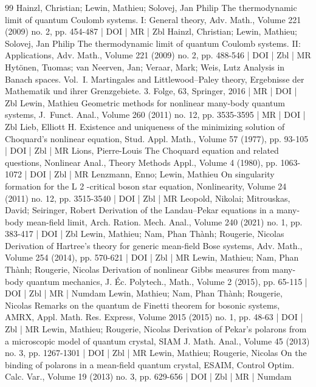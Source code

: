 \begin{thebibliography}{99}
 Hainzl, Christian; Lewin, Mathieu; Solovej, Jan Philip The thermodynamic limit of quantum Coulomb systems. I: General theory, Adv. Math., Volume 221 (2009) no. 2, pp. 454-487 | DOI | MR | Zbl
 Hainzl, Christian; Lewin, Mathieu; Solovej, Jan Philip The thermodynamic limit of quantum Coulomb systems. II: Applications, Adv. Math., Volume 221 (2009) no. 2, pp. 488-546 | DOI | Zbl | MR
 Hytönen, Tuomas; van Neerven, Jan; Veraar, Mark; Weis, Lutz Analysis in Banach spaces. Vol. I. Martingales and Littlewood–Paley theory, Ergebnisse der Mathematik und ihrer Grenzgebiete. 3. Folge, 63, Springer, 2016 | MR | DOI | Zbl
 Lewin, Mathieu Geometric methods for nonlinear many-body quantum systems, J. Funct. Anal., Volume 260 (2011) no. 12, pp. 3535-3595 | MR | DOI | Zbl
 Lieb, Elliott H. Existence and uniqueness of the minimizing solution of Choquard’s nonlinear equation, Stud. Appl. Math., Volume 57 (1977), pp. 93-105 | DOI | Zbl | MR
 Lions, Pierre-Louis The Choquard equation and related questions, Nonlinear Anal., Theory Methods Appl., Volume 4 (1980), pp. 1063-1072 | DOI | Zbl | MR
 Lenzmann, Enno; Lewin, Mathieu On singularity formation for the L 2 -critical boson star equation, Nonlinearity, Volume 24 (2011) no. 12, pp. 3515-3540 | DOI | Zbl | MR
 Leopold, Nikolai; Mitrouskas, David; Seiringer, Robert Derivation of the Landau–Pekar equations in a many-body mean-field limit, Arch. Ration. Mech. Anal., Volume 240 (2021) no. 1, pp. 383-417 | DOI | Zbl
 Lewin, Mathieu; Nam, Phan Thành; Rougerie, Nicolas Derivation of Hartree’s theory for generic mean-field Bose systems, Adv. Math., Volume 254 (2014), pp. 570-621 | DOI | Zbl | MR
 Lewin, Mathieu; Nam, Phan Thành; Rougerie, Nicolas Derivation of nonlinear Gibbs measures from many-body quantum mechanics, J. Éc. Polytech., Math., Volume 2 (2015), pp. 65-115 | DOI | Zbl | MR | Numdam
 Lewin, Mathieu; Nam, Phan Thành; Rougerie, Nicolas Remarks on the quantum de Finetti theorem for bosonic systems, AMRX, Appl. Math. Res. Express, Volume 2015 (2015) no. 1, pp. 48-63 | DOI | Zbl | MR
 Lewin, Mathieu; Rougerie, Nicolas Derivation of Pekar’s polarons from a microscopic model of quantum crystal, SIAM J. Math. Anal., Volume 45 (2013) no. 3, pp. 1267-1301 | DOI | Zbl | MR
 Lewin, Mathieu; Rougerie, Nicolas On the binding of polarons in a mean-field quantum crystal, ESAIM, Control Optim. Calc. Var., Volume 19 (2013) no. 3, pp. 629-656 | DOI | Zbl | MR | Numdam

\end{thebibliography}
